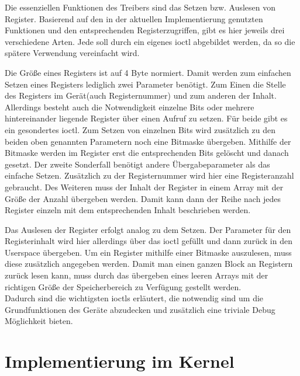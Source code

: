 Die essenziellen Funktionen des Treibers sind das Setzen bzw. Auslesen von Register. Basierend auf den in der aktuellen Implementierung genutzten Funktionen und den entsprechenden Registerzugriffen, gibt es hier jeweils drei verschiedene Arten. Jede soll durch ein eigenes \ac{ioctl} abgebildet werden, da so die spätere Verwendung vereinfacht wird. 


Die Größe eines Registers ist auf 4 Byte normiert. Damit werden zum einfachen Setzen eines Registers lediglich zwei Parameter benötigt. Zum Einen die Stelle des Registers im Gerät(auch Registernummer) und zum anderen der Inhalt. 
Allerdings besteht auch die Notwendigkeit einzelne Bits oder mehrere hintereinander liegende Register über einen Aufruf zu setzen. Für beide gibt es ein gesondertes \ac{ioctl}. Zum Setzen von einzelnen Bits wird zusätzlich zu den beiden oben genannten Parametern noch eine Bitmaske übergeben. Mithilfe der Bitmaske werden im Register erst die entsprechenden Bits gelöscht und danach gesetzt. 
Der zweite Sonderfall benötigt andere Übergabeparameter als das einfache Setzen. Zusätzlich zu der Registernummer wird hier eine Registeranzahl gebraucht. Des Weiteren muss der Inhalt der Register in einem Array mit der Größe der Anzahl übergeben werden. Damit kann dann der Reihe nach jedes Register einzeln mit dem entsprechenden Inhalt beschrieben werden.


Das Auslesen der Register erfolgt analog zu dem Setzen. Der Parameter für den Registerinhalt wird hier allerdings über das \ac{ioctl} gefüllt und dann zurück in den Userspace übergeben. 
Um ein Register mithilfe einer Bitmaske auszulesen, muss diese zusätzlich angegeben werden. Damit man einen ganzen Block an Registern zurück lesen kann, muss durch das übergeben eines leeren Arrays mit der richtigen Größe der Speicherbereich zu Verfügung gestellt werden.\\

Dadurch sind die wichtigsten \ac{ioctl}s erläutert, die notwendig sind um die Grundfunktionen des Geräte abzudecken und zusätzlich eine triviale Debug Möglichkeit bieten.

\section{Implementierung im Kernel}\label{sec:kernel}


